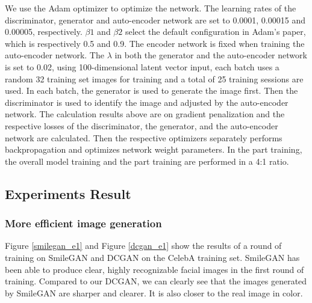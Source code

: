 We use the Adam optimizer to optimize the network.
The learning rates of the discriminator, generator and auto-encoder network are set to 0.0001, 0.00015 and 0.00005, respectively.
$\beta1$ and $\beta2$ select the default configuration in Adam's paper, which is respectively 0.5 and 0.9.
The encoder network is fixed when training the auto-encoder network.
The $\lambda$ in both the generator and the auto-encoder network is set to 0.02, using 100-dimensional latent vector input, each batch uses a random 32 training set images for training and a total of 25 training sessions are used.
In each batch, the generator is used to generate the image first.
Then the discriminator is used to identify the image and adjusted by the auto-encoder network.
The calculation results above are on gradient penalization and the respective losses of the discriminator, the generator, and the auto-encoder network are calculated.
Then the respective optimizers separately performs backpropagation and optimizes network weight parameters.
In the part training, the overall model training and the part training are performed in a 4:1 ratio.

\subsection{Experiments Result}
\subsubsection*{More efficient image generation} 
Figure \ref{smilegan_e1} and Figure \ref{dcgan_e1} show the results of a round of training on SmileGAN and DCGAN on the CelebA training set.
SmileGAN has been able to produce clear, highly recognizable facial images in the first round of training.
Compared to our DCGAN, we can clearly see that the images generated by SmileGAN are sharper and clearer.
It is also closer to the real image in color.


